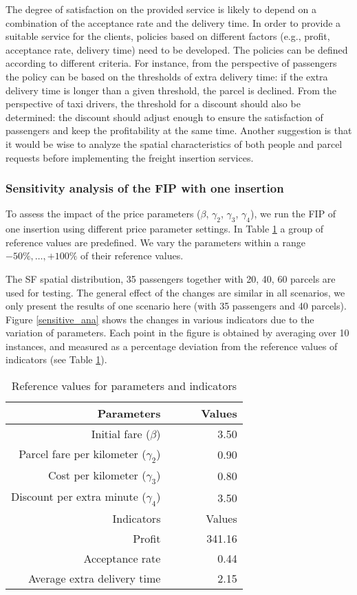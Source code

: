 \documentclass[preprint,authoryear,12pt]{elsarticle}
\begin{document}
The degree of satisfaction on the provided service is likely to depend on a combination of the acceptance rate and the delivery time. In order to provide a suitable service for the clients, policies based on different factors (e.g., profit, acceptance rate, delivery time) need to be developed. The policies can be defined according to different criteria. For instance, from the perspective of passengers the policy can be based on the thresholds of extra delivery time: if the extra delivery time is longer than a given threshold, the parcel is declined. From the perspective of taxi drivers, the threshold for a discount should also be determined: the discount should adjust enough to ensure the satisfaction of passengers and keep the profitability at the same time.  Another suggestion is that it would be wise to analyze the spatial characteristics of both people and parcel requests before implementing the freight insertion services.


\subsubsection{Sensitivity analysis of the FIP with one insertion}
To assess the impact of the price parameters ($\beta$, $\gamma_2$, $\gamma_3$, $\gamma_4$), we run the FIP of one insertion using different price parameter settings. In Table \ref{FIX} a group of reference values are predefined. We vary the parameters within a range $-50\%,\dots,+100\%$  of their reference values.

The SF spatial distribution, 35 passengers together with 20, 40, 60 parcels are used for testing. The general effect of the changes are similar in all scenarios, we only present the results of one scenario here (with 35 passengers and 40 parcels). Figure \ref{sensitive_ana} shows the changes in various indicators due to the variation of parameters. Each point in the figure is obtained by averaging over 10 instances, and measured as a percentage deviation from the reference values of indicators (see Table \ref{FIX}).

\begin{table} [!htbp]
\caption{Reference values for parameters and indicators}
\vspace{-1em}
\small
\center
\begin{tabular}{rr}
\hline
Parameters &~~~~ Values\\
\hline
Initial fare ($\beta$)& {3.50}\\
Parcel fare per kilometer ($\gamma_2$) &{0.90} \\
Cost per kilometer ($\gamma_3$) &{0.80} \\
Discount per extra minute ($\gamma_4$) &{3.50}\\
\hline
Indicators &~~~~ Values\\
\hline
Profit & 341.16\\
Acceptance rate & 0.44\\
Average extra delivery time & 2.15\\
\hline
\end{tabular}
\label{FIX}
\end{table}
\end{document}
